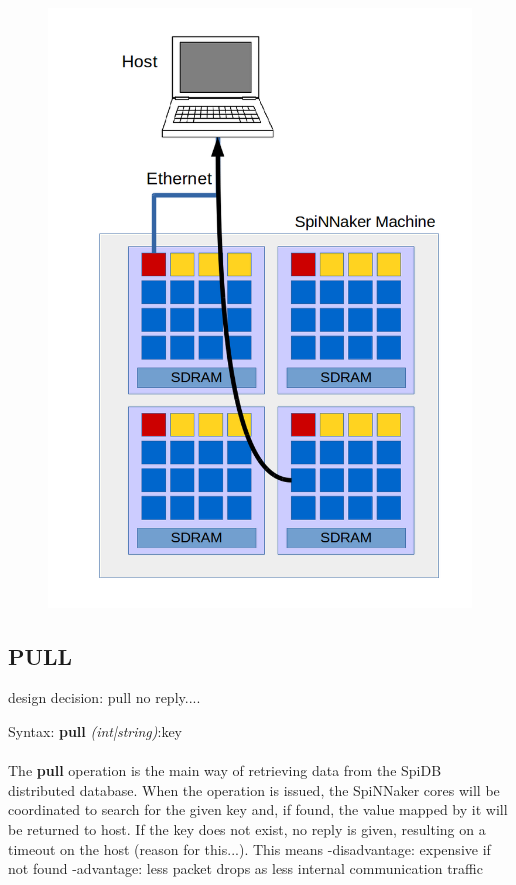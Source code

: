 \begin{figure}
\begin{minipage}{.32\textwidth}
  \includegraphics[width=1\linewidth, natwidth=794, natheight=1123]{images/put3.png}
  \label{fig:leaf-host}
\end{minipage}
\end{figure}


\subsection{PULL}


design decision: pull no reply....

 Syntax:
 \noindent
 {\large\textbf{pull} \textit{(int|string)}:key}\\\\
 
The \textbf{pull} operation is the main way of retrieving data from the SpiDB distributed database.
When the operation is issued, the SpiNNaker cores will be coordinated to search for the given key and, if found, the value mapped by it will be returned to host. If the key does not exist, no reply is given, resulting on a timeout on the host (reason for this...). This means 
-disadvantage: expensive if not found
-advantage: less packet drops as less internal communication traffic
 
